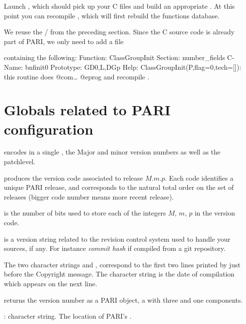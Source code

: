 \item Launch , which should pick up your C files and build an
appropriate . At this point you can recompile , which
will first rebuild the functions database.

 We reuse the  / 
from the preceding section. Since the C source code is already part
of PARI, we only need to add a file


\noindent containing the following:
\bprog
Function: ClassGroupInit
Section: number_fields
C-Name: bnfinit0
Prototype: GD0,L,DGp
Help: ClassGroupInit(P,{flag=0},{tech=[]}): this routine does @com\dots
@eprog\noindent
and recompile .

\section{Globals related to PARI configuration}

\noindent {} encodes in a single , the Major
and minor version numbers as well as the patchlevel.

 produces the version code
associated to release $M.m.p$. Each code identifies a unique PARI release,
and corresponds to the natural total order on the set of releases (bigger
code number means more recent release).

\noindent {} is the number of bits used to store each of
the integers $M$, $m$, $p$ in the version code.

\noindent {} is a version string related to the
revision control system used to handle your sources, if any. For instance
\emph{commit hash} if compiled from a git repository.

The two character strings  and ,
correspond to the first two lines printed by  just before the
Copyright message. The character string  is the
date of compilation which appears on the next line.

 returns the version number as a PARI object, a
 with three  and one  components.


: character string. The location of PARI's .

